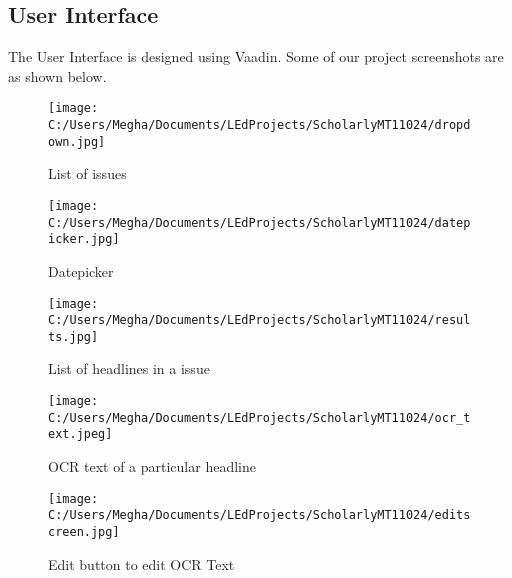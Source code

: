 \documentclass[amsart, 12pt]{article}
\begin{document}
\subsection{User Interface}
The User Interface is designed using Vaadin. Some of our project screenshots are as shown below.

\begin{figure}[H]
\centering
\texttt{[image: C:/Users/Megha/Documents/LEdProjects/ScholarlyMT11024/dropdown.jpg]}
\caption{List of issues}
\label{fig:Phase 1}
\end{figure}

\begin{figure}[H]
\centering
\texttt{[image: C:/Users/Megha/Documents/LEdProjects/ScholarlyMT11024/datepicker.jpg]}
\caption{Datepicker}
\label{fig:Phase 1}
\end{figure}

\begin{figure}[H]
\centering
\texttt{[image: C:/Users/Megha/Documents/LEdProjects/ScholarlyMT11024/results.jpg]}
\caption{List of headlines in a issue}
\label{fig:Phase 2}
\end{figure}

\begin{figure}[H]
\centering
\texttt{[image: C:/Users/Megha/Documents/LEdProjects/ScholarlyMT11024/ocr\_text.jpeg]}
\caption{OCR text of a particular headline}
\label{fig:Phase 2}
\end{figure}

\begin{figure}[H]
\centering
\texttt{[image: C:/Users/Megha/Documents/LEdProjects/ScholarlyMT11024/editscreen.jpg]}
\caption{Edit button to edit OCR Text}
\label{fig:Phase 2}
\end{figure}
\end{document}
